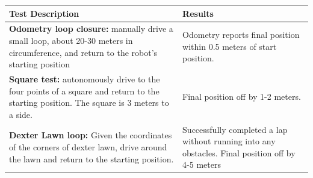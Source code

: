 \begin{tabular}{ | p{} | p{} | }
        \hline
        \textbf{Test Description} & \textbf{Results} \\
           \hline
           \textbf{Odometry loop closure:} manually drive a small loop, about 20-30 meters in circumference, and return to the robot's starting position & Odometry reports final position within 0.5 meters of start position. \\
              \hline
\textbf{Square test:} autonomously drive to the four points of a square and return to the starting position. The square is 3 meters to a side. & Final position off by 1-2 meters. \\
       \hline
\textbf{Dexter Lawn loop:} Given the coordinates of the corners of dexter lawn, drive around the lawn and return to the starting position. & Successfully completed a lap without running into any obstacles. Final position off by 4-5 meters \\
       \hline
\end{tabular}
